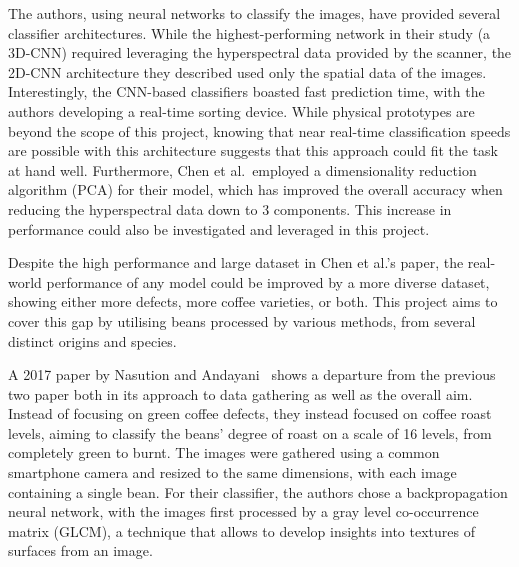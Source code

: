 The authors, using neural networks to classify the images, have provided several
classifier architectures.
While the highest-performing network in their study (a
3D-CNN) required leveraging the hyperspectral data provided by the scanner, the
2D-CNN architecture they described used only the spatial data of the images.
Interestingly,
the CNN-based classifiers boasted fast prediction time, with the authors developing
a real-time sorting device.
While physical prototypes are beyond the scope of
this project, knowing that near real-time classification speeds are possible with
this architecture suggests that this approach could fit the task at hand well.
Furthermore, Chen et al.\ employed a dimensionality reduction algorithm (PCA)
for their model, which has improved the overall accuracy when reducing the hyperspectral
data down to 3 components.
This increase in performance could also be
investigated and leveraged in this project.

Despite the high performance and large dataset in Chen et al.'s paper, the real-world
performance of any model could be improved by a more diverse dataset, showing either
more defects, more coffee varieties, or both.
This project aims to cover this
gap by utilising beans processed by various methods, from several distinct origins
and species.

A 2017 paper by Nasution and Andayani~\cite{manyRoastLevelsNasution} shows a
departure from the previous two paper both in its approach to data gathering as
well as the overall aim.
Instead of focusing on green coffee defects, they
instead focused on coffee roast levels, aiming to classify the beans' degree of
roast on a scale of 16 levels, from completely green to burnt.
The images were
gathered using a common smartphone camera and resized to the same dimensions, with
each image containing a single bean.
For their classifier, the authors chose a backpropagation
neural network, with the images first processed by a gray level co-occurrence
matrix (GLCM), a technique that allows to develop insights into textures of surfaces
from an image.

